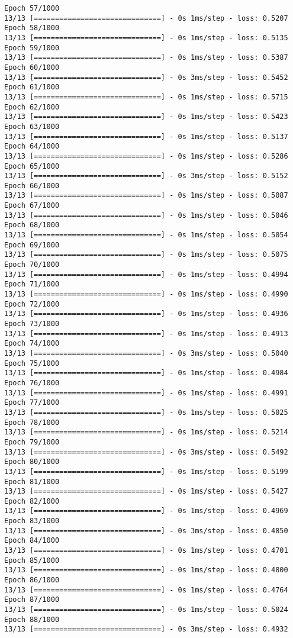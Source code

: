 \documentclass[11pt]{article}
\begin{document}
\begin{Verbatim}[commandchars=\\\{\}]
Epoch 57/1000
13/13 [==============================] - 0s 1ms/step - loss: 0.5207
Epoch 58/1000
13/13 [==============================] - 0s 1ms/step - loss: 0.5135
Epoch 59/1000
13/13 [==============================] - 0s 1ms/step - loss: 0.5387
Epoch 60/1000
13/13 [==============================] - 0s 3ms/step - loss: 0.5452
Epoch 61/1000
13/13 [==============================] - 0s 1ms/step - loss: 0.5715
Epoch 62/1000
13/13 [==============================] - 0s 1ms/step - loss: 0.5423
Epoch 63/1000
13/13 [==============================] - 0s 1ms/step - loss: 0.5137
Epoch 64/1000
13/13 [==============================] - 0s 1ms/step - loss: 0.5286
Epoch 65/1000
13/13 [==============================] - 0s 3ms/step - loss: 0.5152
Epoch 66/1000
13/13 [==============================] - 0s 1ms/step - loss: 0.5087
Epoch 67/1000
13/13 [==============================] - 0s 1ms/step - loss: 0.5046
Epoch 68/1000
13/13 [==============================] - 0s 1ms/step - loss: 0.5054
Epoch 69/1000
13/13 [==============================] - 0s 1ms/step - loss: 0.5075
Epoch 70/1000
13/13 [==============================] - 0s 1ms/step - loss: 0.4994
Epoch 71/1000
13/13 [==============================] - 0s 1ms/step - loss: 0.4990
Epoch 72/1000
13/13 [==============================] - 0s 1ms/step - loss: 0.4936
Epoch 73/1000
13/13 [==============================] - 0s 1ms/step - loss: 0.4913
Epoch 74/1000
13/13 [==============================] - 0s 3ms/step - loss: 0.5040
Epoch 75/1000
13/13 [==============================] - 0s 1ms/step - loss: 0.4984
Epoch 76/1000
13/13 [==============================] - 0s 1ms/step - loss: 0.4991
Epoch 77/1000
13/13 [==============================] - 0s 1ms/step - loss: 0.5025
Epoch 78/1000
13/13 [==============================] - 0s 1ms/step - loss: 0.5214
Epoch 79/1000
13/13 [==============================] - 0s 3ms/step - loss: 0.5492
Epoch 80/1000
13/13 [==============================] - 0s 1ms/step - loss: 0.5199
Epoch 81/1000
13/13 [==============================] - 0s 1ms/step - loss: 0.5427
Epoch 82/1000
13/13 [==============================] - 0s 1ms/step - loss: 0.4969
Epoch 83/1000
13/13 [==============================] - 0s 3ms/step - loss: 0.4850
Epoch 84/1000
13/13 [==============================] - 0s 1ms/step - loss: 0.4701
Epoch 85/1000
13/13 [==============================] - 0s 1ms/step - loss: 0.4800
Epoch 86/1000
13/13 [==============================] - 0s 1ms/step - loss: 0.4764
Epoch 87/1000
13/13 [==============================] - 0s 1ms/step - loss: 0.5024
Epoch 88/1000
13/13 [==============================] - 0s 3ms/step - loss: 0.4932

\end{Verbatim}
\end{document}
